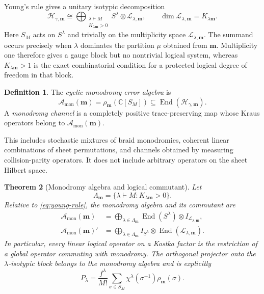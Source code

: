 \documentclass[11pt]{article}
\newtheorem{theorem}{Theorem}[section]
\theoremstyle{definition}
\newtheorem{definition}[theorem]{Definition}
\theoremstyle{remark}
\newcommand{\C}{\mathbb C}
\newcommand{\cH}{\mathcal H}
\newcommand{\cA}{\mathcal A}
\newcommand{\cL}{\mathcal L}
\newcommand{\End}{\operatorname{End}}
\begin{document}
Young's rule gives a unitary isotypic decomposition \cite{FultonYoungTableaux1997,Sagan2001}
\begin{equation}\label{eq:young-rule}
 \cH_{\gamma,\boldsymbol m}
 \cong
 \bigoplus_{\substack{\lambda\vdash M\\ K_{\lambda\boldsymbol m}>0}}
 S^\lambda\otimes \cL_{\lambda,\boldsymbol m},
 \qquad
 \dim\cL_{\lambda,\boldsymbol m}=K_{\lambda\boldsymbol m}.
\end{equation}
Here $S_M$ acts on $S^\lambda$ and trivially on the multiplicity space $\cL_{\lambda,\boldsymbol m}$.
The summand occurs precisely when $\lambda$ dominates the partition $\mu$ obtained from $\boldsymbol m$.  Multiplicity one therefore gives a gauge block but no nontrivial logical system, whereas $K_{\lambda\boldsymbol m}>1$ is the exact combinatorial condition for a protected logical degree of freedom in that block.

\begin{definition}\label{def:monodromy-error-algebra}
The \emph{cyclic monodromy error algebra} is
\begin{equation}\label{eq:monodromy-error-algebra}
 \cA_{\mathrm{mon}}(\boldsymbol m)
 =\rho_{\boldsymbol m}(\C[S_M])
 \subseteq\End(\cH_{\gamma,\boldsymbol m}).
\end{equation}
A \emph{monodromy channel} is a completely positive trace-preserving map whose Kraus operators belong to $\cA_{\mathrm{mon}}(\boldsymbol m)$.
\end{definition}

This includes stochastic mixtures of braid monodromies, coherent linear combinations of sheet permutations, and channels obtained by measuring collision-parity operators.  It does not include arbitrary operators on the sheet Hilbert space.

\begin{theorem}[Monodromy algebra and logical commutant]\label{thm:algebra-commutant}
Let
\[
 \Lambda_{\boldsymbol m}
 =\{\lambda\vdash M:K_{\lambda\boldsymbol m}>0\}.
\]
Relative to \eqref{eq:young-rule}, the monodromy algebra and its commutant are
\begin{align}
 \cA_{\mathrm{mon}}(\boldsymbol m)
 &=\bigoplus_{\lambda\in\Lambda_{\boldsymbol m}}
   \End(S^\lambda)\otimes I_{\cL_{\lambda,\boldsymbol m}},
   \label{eq:mon-algebra-wedderburn}\\
 \cA_{\mathrm{mon}}(\boldsymbol m)'
 &=\bigoplus_{\lambda\in\Lambda_{\boldsymbol m}}
   I_{S^\lambda}\otimes\End(\cL_{\lambda,\boldsymbol m}).
   \label{eq:mon-commutant-wedderburn}
\end{align}
In particular, every linear logical operator on a Kostka factor is the restriction of a global operator commuting with monodromy.  The orthogonal projector onto the $\lambda$-isotypic block belongs to the monodromy algebra and is explicitly
\begin{equation}\label{eq:central-isotypic-projector}
 P_\lambda
 =\frac{f^\lambda}{M!}
   \sum_{\sigma\in S_M}\chi^\lambda(\sigma^{-1})
   \rho_{\boldsymbol m}(\sigma).
\end{equation}
\end{theorem}
\end{document}
